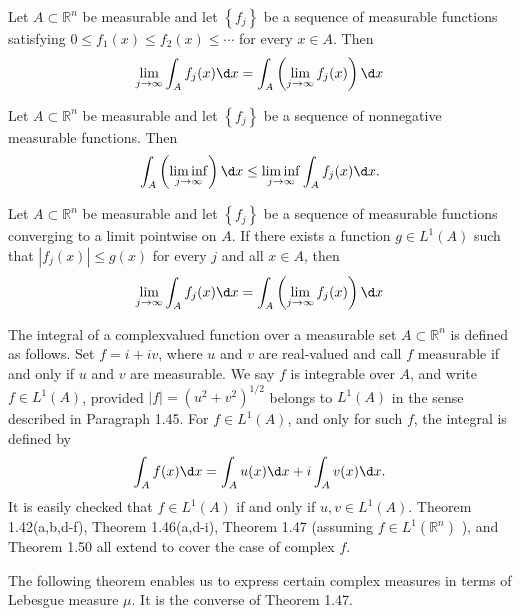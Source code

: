 \begin{theorem}
  Let $A \subset \mathbb{R}^n$ be measurable and let $\left\{f_j\right\}$ be a sequence of measurable functions satisfying $0 \leq f_1(x) \leq f_2(x) \leq \cdots$ for every $x \in A$. Then
  \[
  \lim _{j \rightarrow \infty} \int_A f_j(x) \d x=\int_A\left(\lim _{j \rightarrow \infty} f_j(x)\right) \d x
  \]
\end{theorem}


\begin{theorem}
  Let $A \subset \mathbb{R}^n$ be measurable and let $\left\{f_j\right\}$ be a sequence of nonnegative measurable functions. Then
  \[
  \int_A\left(\liminf _{j \rightarrow \infty}\right) \d x \leq \liminf _{j \rightarrow \infty} \int_A f_j(x) \d x .
  \]
\end{theorem}

\begin{theorem}
  Let $A \subset \mathbb{R}^n$ be measurable and let $\left\{f_j\right\}$ be a sequence of measurable functions converging to a limit pointwise on $A$. If there exists a function $g \in L^1(A)$ such that $\left|f_j(x)\right| \leq g(x)$ for every $j$ and all $x \in A$, then
  \[
  \lim _{j \rightarrow \infty} \int_A f_j(x) \d x=\int_A\left(\lim _{j \rightarrow \infty} f_j(x)\right) \d x
  \]
\end{theorem}


\begin{para}
  The integral of a complexvalued function over a measurable set $A \subset \mathbb{R}^n$ is defined as follows. Set $f=i+i v$, where $u$ and $v$ are real-valued and call $f$ measurable if and only if $u$ and $v$ are measurable. We say $f$ is integrable over $A$, and write $f \in L^1(A)$, provided $|f|=\left(u^2+v^2\right)^{1 / 2}$ belongs to $L^1(A)$ in the sense described in Paragraph 1.45. For $f \in L^1(A)$, and only for such $f$, the integral is defined by
  \[
  \int_A f(x) \d x=\int_A u(x) \d x+i \int_A v(x) \d x .
  \]
  It is easily checked that $f \in L^1(A)$ if and only if $u, v \in L^1(A)$. Theorem 1.42(a,b,d-f), Theorem 1.46(a,d-i), Theorem 1.47 (assuming $f \in L^1\left(\mathbb{R}^n\right)$ ), and Theorem 1.50 all extend to cover the case of complex $f$.
\end{para}

The following theorem enables us to express certain complex measures in terms of Lebesgue measure $\mu$. It is the converse of Theorem 1.47.

